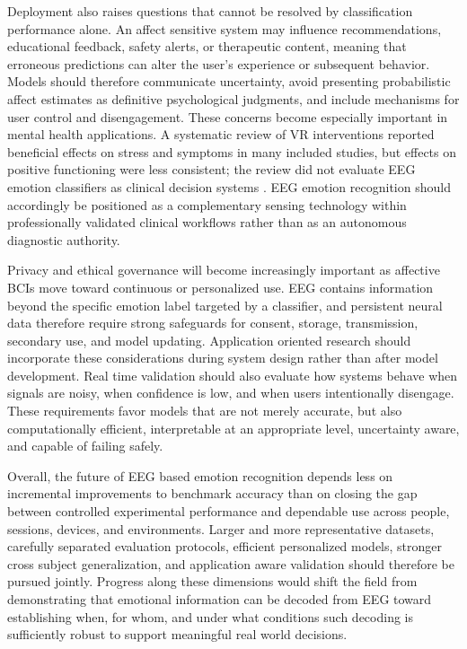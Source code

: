 \documentclass[ASNA,twocolumn]{USG}
\begin{document}
Deployment also raises questions that cannot be resolved by classification performance alone. An affect sensitive system may influence recommendations, educational feedback, safety alerts, or therapeutic content, meaning that erroneous predictions can alter the user's experience or subsequent behavior. Models should therefore communicate uncertainty, avoid presenting probabilistic affect estimates as definitive psychological judgments, and include mechanisms for user control and disengagement. These concerns become especially important in mental health applications. A systematic review of VR interventions reported beneficial effects on stress and symptoms in many included studies, but effects on positive functioning were less consistent; the review did not evaluate EEG emotion classifiers as clinical decision systems \cite{pira2023use}. EEG emotion recognition should accordingly be positioned as a complementary sensing technology within professionally validated clinical workflows rather than as an autonomous diagnostic authority.

Privacy and ethical governance will become increasingly important as affective BCIs move toward continuous or personalized use. EEG contains information beyond the specific emotion label targeted by a classifier, and persistent neural data therefore require strong safeguards for consent, storage, transmission, secondary use, and model updating. Application oriented research should incorporate these considerations during system design rather than after model development. Real time validation should also evaluate how systems behave when signals are noisy, when confidence is low, and when users intentionally disengage. These requirements favor models that are not merely accurate, but also computationally efficient, interpretable at an appropriate level, uncertainty aware, and capable of failing safely.

Overall, the future of EEG based emotion recognition depends less on incremental improvements to benchmark accuracy than on closing the gap between controlled experimental performance and dependable use across people, sessions, devices, and environments. Larger and more representative datasets, carefully separated evaluation protocols, efficient personalized models, stronger cross subject generalization, and application aware validation should therefore be pursued jointly. Progress along these dimensions would shift the field from demonstrating that emotional information can be decoded from EEG toward establishing when, for whom, and under what conditions such decoding is sufficiently robust to support meaningful real world decisions.
\end{document}
